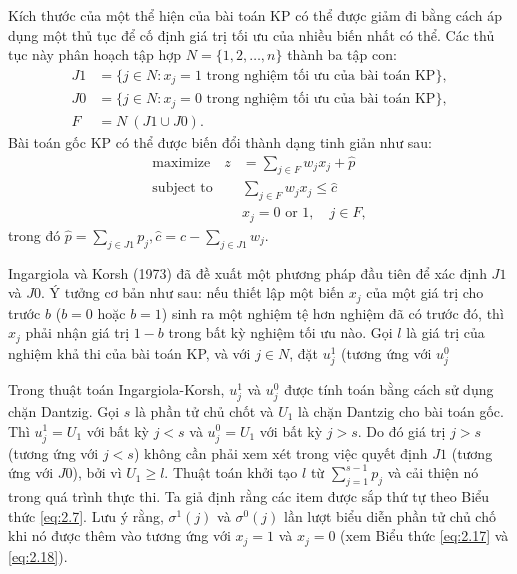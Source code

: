 Kích thước của một thể hiện của bài toán KP có thể được giảm đi bằng cách áp dụng một thủ tục để cố định giá trị tối ưu của nhiều biến nhất có thể. Các thủ tục này phân hoạch tập hợp $N = \{1, 2, \dots, n\}$ thành ba tập con:
\begin{align*}
    J1 &= \{j \in N: x_j = 1 \text{ trong nghiệm tối ưu của bài toán KP}\},\\
    J0 &= \{j \in N: x_j = 0 \text{ trong nghiệm tối ưu của bài toán KP}\},\\
    F &= N \ (J1 \cup J0).
\end{align*}
Bài toán gốc KP có thể được biến đổi thành dạng tinh giản như sau:
\begin{align*}
    \text{maximize}\quad z &= \sum_{j \in F}w_jx_j + \hat{p}\\
    \text{subject to}\quad &\sum_{j \in F}w_jx_j \leq \hat{c}\\
    & x_j = 0 \text{ or } 1,\quad j \in F, 
\end{align*}
trong đó $\hat{p} = \sum_{j \in J1}p_j, \hat{c} = c - \sum_{j \in J1}w_j$.

Ingargiola và Korsh (1973) đã đề xuất một phương pháp đầu tiên để xác định $J1$ và $J0$. Ý tưởng cơ bản như sau: nếu thiết lập một biến $x_j$ của một giá trị cho trước $b$ ($b = 0$ hoặc $b = 1$) sinh ra một nghiệm tệ hơn nghiệm đã có trước đó, thì $x_j$ phải nhận giá trị $1 - b$ trong bất kỳ nghiệm tối ưu nào. Gọi $l$ là giá trị của nghiệm khả thi của bài toán KP, và với $j \in N$, đặt $u^1_j$ (tương ứng với $u_j^0$

Trong thuật toán Ingargiola-Korsh, $u_j^1$ và $u_j^0$ được tính toán bằng cách sử dụng chặn Dantzig. Gọi $s$ là phần tử chủ chốt và $U_1$ là chặn Dantzig cho bài toán gốc. Thì $u_j^1 = U_1$ với bất kỳ $j < s$ và $u_j^0 = U_1$ với bất kỳ $j > s$. Do đó giá trị $j > s$ (tương ứng với $j < s$) không cần phải xem xét trong việc quyết định $J1$ (tương ứng với $J0$), bởi vì $U_1 \geq l$. Thuật toán khởi tạo $l$ từ $\sum_{j = 1}^{s - 1}p_j$ và cải thiện nó trong quá trình thực thi. Ta giả định rằng các item được sắp thứ tự theo Biểu thức \eqref{eq:2.7}. Lưu ý rằng, $\sigma^1(j)$ và $\sigma^0(j)$ lần lượt biểu diễn phần tử chủ chố khi nó được thêm vào tương ứng với $x_j = 1$ và $x_j = 0$ (xem Biểu thức \eqref{eq:2.17} và \eqref{eq:2.18}).

